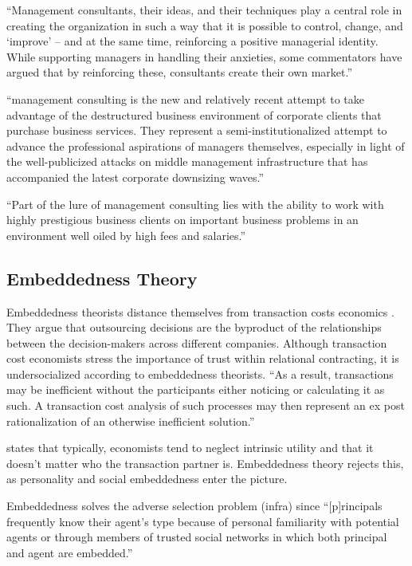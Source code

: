 \documentclass[12pt]{article}
\begin{document}
``Management consultants, their ideas, and their techniques play a
central role in creating the organization in such a way that it is
possible to control, change, and `improve' -- and at the same time,
reinforcing a positive managerial identity. While supporting managers in
handling their anxieties, some commentators have argued that by
reinforcing these, consultants create their own market.'' \citep[
48]{werr2002}

``management consulting is the new and relatively recent attempt to take
advantage of the destructured business environment of corporate clients
that purchase business services. They represent a semi-institutionalized
attempt to advance the professional aspirations of managers themselves,
especially in light of the well-publicized attacks on middle management
infrastructure that has accompanied the latest corporate downsizing
waves.'' \citep[ 35]{leicht2006}

``Part of the lure of management consulting lies with the ability to
work with highly prestigious business clients on important business
problems in an environment well oiled by high fees and salaries.''
\citep[ 37]{leicht2006}

\hypertarget{embeddedness-theory}{%
\subsection{Embeddedness Theory}\label{embeddedness-theory}}

Embeddedness theorists distance themselves from transaction costs
economics \citep[ 14-16]{armbruster2006}. They argue that outsourcing
decisions are the byproduct of the relationships between the
decision-makers across different companies. Although transaction cost
economists stress the importance of trust within relational contracting,
it is undersocialized according to embeddedness theorists. ``As a
result, transactions may be inefficient without the participants either
noticing or calculating it as such. A transaction cost analysis of such
processes may then represent an ex post rationalization of an otherwise
inefficient solution.'' \citep[ 15]{armbruster2006}

\citet[992]{nooteboom1996} states that typically, economists tend to
neglect intrinsic utility and that it doesn't matter who the transaction
partner is. Embeddedness theory rejects this, as personality and social
embeddedness enter the picture.

Embeddedness solves the adverse selection problem (infra) since
``{[}p{]}rincipals frequently know their agent's type because of
personal familiarity with potential agents or through members of trusted
social networks in which both principal and agent are embedded.''
\citep[ 277]{shapiro2005}
\end{document}
